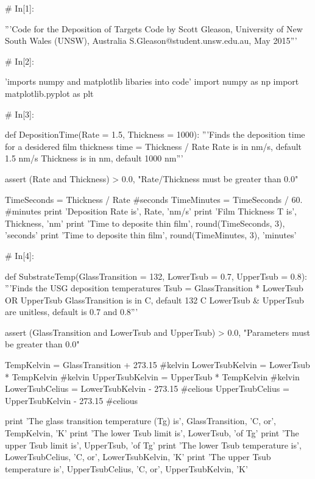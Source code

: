 \documentclass[a4paper,8pt]{article}
\begin{document}
\begin{python}
	# In[1]:
	
	'''Code for the Deposition of Targets
	Code by Scott Gleason, University of New South Wales (UNSW), Australia 
	S.Gleason@student.unsw.edu.au, May 2015'''
	
	
	# In[2]:
	
	'imports numpy and matplotlib libaries into code'
	import numpy as np
	import matplotlib.pyplot as plt
	
	
	# In[3]:
	
	def DepositionTime(Rate = 1.5, Thickness = 1000):
	'''Finds the deposition time for a desidered film thickness 
	time = Thickness / Rate
	Rate is in nm/s, default 1.5 nm/s
	Thickness is in nm, default 1000 nm'''
	
	assert (Rate and Thickness) > 0.0, "Rate/Thickness must be greater than 0.0"
	
	TimeSeconds = Thickness / Rate #seconds
	TimeMinutes = TimeSeconds / 60. #minutes
	print 'Deposition Rate is', Rate, 'nm/s'
	print 'Film Thickness T is', Thickness, 'nm'
	print 'Time to deposite thin film', round(TimeSeconds, 3), 'seconds'
	print 'Time to deposite thin film', round(TimeMinutes, 3), 'minutes'
	
	
	# In[4]:
	
	def SubstrateTemp(GlassTransition = 132, LowerTsub = 0.7, UpperTsub = 0.8):
	'''Finds the USG deposition temperatures 
	Tsub = GlassTransition * LowerTsub OR UpperTsub
	GlassTransition is in C, default 132 C
	LowerTsub & UpperTsub are unitless, default is 0.7 and 0.8'''
	
	assert (GlassTransition and LowerTsub and UpperTsub) > 0.0, "Parameters must be greater than 0.0"
	
	TempKelvin = GlassTransition + 273.15 #kelvin
	LowerTsubKelvin = LowerTsub * TempKelvin #kelvin
	UpperTsubKelvin = UpperTsub * TempKelvin #kelvin
	LowerTsubCelius = LowerTsubKelvin - 273.15 #celious
	UpperTsubCelius = UpperTsubKelvin - 273.15 #celious
	
	print 'The glass transition temperature (Tg) is', GlassTransition, 'C,  or', TempKelvin, 'K'
	print 'The lower Tsub limit is', LowerTsub, 'of Tg'
	print 'The upper Tsub limit is', UpperTsub, 'of Tg'
	print 'The lower Tsub temperature is', LowerTsubCelius, 'C,  or', LowerTsubKelvin, 'K'
	print 'The upper Tsub temperature is', UpperTsubCelius, 'C,  or', UpperTsubKelvin, 'K'
	
\end{python}
\end{document}

